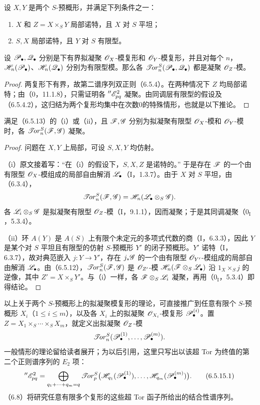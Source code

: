 设 $X,Y$ 是两个 $S$-预概形，并满足下列条件之一：
\begin{enumerate}[label=(\roman*)]
\item $X$ 和 $Z=X\times_S Y$ 局部诺特，且 $X$ 对 $S$ 平坦；
\item $S,X$ 局部诺特，且 $Y$ 对 $S$ 有限型。
\end{enumerate}
设 $\mathscr P_\bullet,\mathscr Q_\bullet$ 分别是下有界拟凝聚 $\mathscr O_X$-模复形和 $\mathscr O_Y$-模复形，并且对每个 $n$，$\mathscr H_n(\mathscr P_\bullet)$、$\mathscr H_n(\mathscr Q_\bullet)$ 分别为有限型模。那么各 $\mathscr{T}\!or_n^S(\mathscr P_\bullet,\mathscr Q_\bullet)$ 都是凝聚 $\mathscr O_Z$-模。
\begin{proof}
两复形下有界，故第二谱序列双正则（6.5.4）。在两种情况下 $Z$ 均局部诺特；由（0，11.1.8），只需证明各 ${}''\mathscr E^2_{pq}$ 凝聚。由同调层有限型的假设及（6.5.4.2），这归结为两个复形均集中在次数0的特殊情形，也就是以下推论。
\end{proof}

满足（6.5.13）的（i）或（ii），且 $\mathscr F,\mathscr G$ 分别为拟凝聚有限型 $\mathscr O_X$-模和 $\mathscr O_Y$-模时，各 $\mathscr{T}\!or_n^S(\mathscr F,\mathscr G)$ 凝聚。
\begin{proof}
问题在 $X,Y$ 上局部，可设 $S,X,Y$ 均仿射。

（i）原文接着写：“在（i）的假设下，$S,X,Z$ 是诺特的。”
于是存在 $\mathscr F$ 的一个由有限型 $\mathscr O_X$-模组成的局部自由解消 $\mathscr L_\bullet$（I，1.3.7）。由于 $X$ 对 $S$ 平坦，由（6.3.4），
\[
 \mathscr{T}\!or_n^S(\mathscr F,\mathscr G)=\mathscr H_n(\mathscr L_\bullet\otimes_S\mathscr G).
\]
各 $\mathscr L_i\otimes_S\mathscr G$ 是拟凝聚有限型 $\mathscr O_Z$-模（I，9.1.1），因而凝聚；于是其同调凝聚（$0_{\mathrm I}$，5.3.4）。

（ii）环 $A(Y)$ 是 $A(S)$ 上有限个未定元的多项式代数的商（I，6.3.3），因此 $Y$ 是某个对 $S$ 平坦且有限型的仿射 $S$-预概形 $Y'$ 的闭子预概形。$Y'$ 诺特（I，6.3.7），故对典范嵌入 $j:Y\to Y'$，存在 $j_*\mathscr G$ 的一个由有限型 $\mathscr O_{Y'}$-模组成的局部自由解消 $\mathscr L_\bullet$。由（6.5.12），$\mathscr{T}\!or_n^S(\mathscr F,\mathscr G)$ 是 $\mathscr O_{Z'}$-模 $\mathscr H_n(\mathscr F\otimes_S\mathscr L_\bullet)$ 沿 $1_X\times_Sj$ 的逆像，其中 $Z'=X\times_S Y'$。与（i）一样，各 $\mathscr F\otimes_S\mathscr L_i$ 凝聚，再用（$0_{\mathrm I}$，5.3.4）即得结论。
\end{proof}

以上关于两个 $S$-预概形上的拟凝聚模复形的理论，可直接推广到任意有限个 $S$-预概形 $X_i$（$1\leq i\leq m$），以及各 $X_i$ 上的拟凝聚 $\mathscr O_{X_i}$-模复形 $\mathscr P_\bullet^{(i)}$。置 $Z=X_1\times_S\cdots\times_S X_m$，就定义出拟凝聚 $\mathscr O_Z$-模
\[
 \mathscr{T}\!or_n^S(\mathscr P_\bullet^{(1)},\ldots,\mathscr P_\bullet^{(m)}).
\]
一般情形的理论留给读者展开；为以后引用，这里只写出以该超 Tor 为终值的第二个正则谱序列的 $E_2$ 项：
\begin{equation}
 {}''\mathscr E^2_{pq}
 =\bigoplus_{q_1+\cdots+q_m=q}\mathscr{T}\!or_p^S
 \bigl(\mathscr H_{q_1}(\mathscr P_\bullet^{(1)}),\ldots,
       \mathscr H_{q_m}(\mathscr P_\bullet^{(m)})\bigr).
 \tag{6.5.15.1}
\end{equation}
（6.8）将研究任意有限多个复形的这些超 Tor 函子所给出的结合性谱序列。
\par
